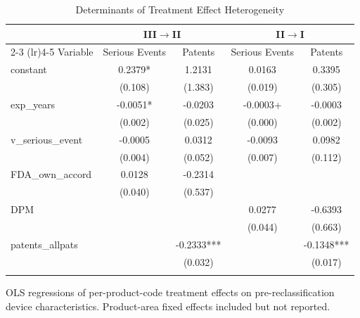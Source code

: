 \begin{table}[htbp]
\centering
\caption{Determinants of Treatment Effect Heterogeneity}
\label{tab:reg_design}
\begin{tabular}{lcccc}
\toprule
& \multicolumn{2}{c}{III$\to$II} & \multicolumn{2}{c}{II$\to$I} \\
\cmidrule(lr){2-3} \cmidrule(lr){4-5}
Variable & Serious Events & Patents & Serious Events & Patents \\
\midrule
constant & 0.2379* & 1.2131 & 0.0163 & 0.3395 \\
 & (0.108) & (1.383) & (0.019) & (0.305) \\
\addlinespace
exp\_years & -0.0051* & -0.0203 & -0.0003+ & -0.0003 \\
 & (0.002) & (0.025) & (0.000) & (0.002) \\
\addlinespace
v\_serious\_event & -0.0005 & 0.0312 & -0.0093 & 0.0982 \\
 & (0.004) & (0.052) & (0.007) & (0.112) \\
\addlinespace
FDA\_own\_accord & 0.0128 & -0.2314 &  &  \\
 & (0.040) & (0.537) &  &  \\
\addlinespace
DPM &  &  & 0.0277 & -0.6393 \\
 &  &  & (0.044) & (0.663) \\
\addlinespace
patents\_allpats &  & -0.2333*** &  & -0.1348*** \\
 &  & (0.032) &  & (0.017) \\
\addlinespace
\bottomrule
\end{tabular}
\begin{tablenotes}\small
\item OLS regressions of per-product-code treatment effects on pre-reclassification device characteristics. Product-area fixed effects included but not reported.
\end{tablenotes}
\end{table}